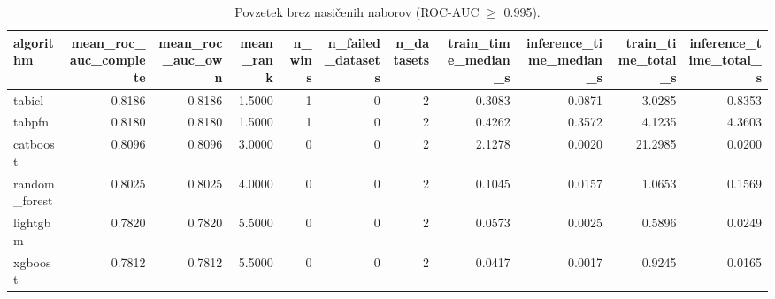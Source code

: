 \begin{table}[htbp]
\centering
\caption{Povzetek brez nasičenih naborov (ROC-AUC $\geq$ 0.995).}
\label{tab:overall-nonsat}
\begin{tabular}{lrrrrrrrrrr}
\hline
algorithm & mean\_roc\_auc\_complete & mean\_roc\_auc\_own & mean\_rank & n\_wins & n\_failed\_datasets & n\_datasets & train\_time\_median\_s & inference\_time\_median\_s & train\_time\_total\_s & inference\_time\_total\_s \\
\hline
tabicl & 0.8186 & 0.8186 & 1.5000 & 1 & 0 & 2 & 0.3083 & 0.0871 & 3.0285 & 0.8353 \\
tabpfn & 0.8180 & 0.8180 & 1.5000 & 1 & 0 & 2 & 0.4262 & 0.3572 & 4.1235 & 4.3603 \\
catboost & 0.8096 & 0.8096 & 3.0000 & 0 & 0 & 2 & 2.1278 & 0.0020 & 21.2985 & 0.0200 \\
random\_forest & 0.8025 & 0.8025 & 4.0000 & 0 & 0 & 2 & 0.1045 & 0.0157 & 1.0653 & 0.1569 \\
lightgbm & 0.7820 & 0.7820 & 5.5000 & 0 & 0 & 2 & 0.0573 & 0.0025 & 0.5896 & 0.0249 \\
xgboost & 0.7812 & 0.7812 & 5.5000 & 0 & 0 & 2 & 0.0417 & 0.0017 & 0.9245 & 0.0165 \\
\hline
\end{tabular}
\end{table}
